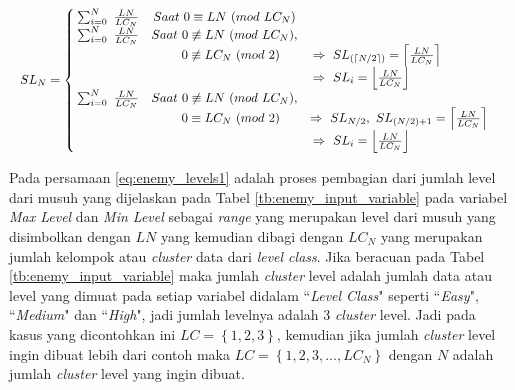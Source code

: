 \begin{equation}\label{eq:enemy_levels1}
	\resizebox{\columnwidth}{!}{%
		$SL_{N} = \left\{\begin{matrix}
		\hspace{0.2em} \sum_{i = 0}^{N}\ \frac{LN}{LC_{N}} & Saat\ 0 \equiv LN\ (mod\ LC_{N}) & \\
		
		\hspace{0.2em} \sum_{i = 0}^{N}\ \frac{LN}{LC_{N}} & Saat\ 0 \not\equiv LN\ (mod\ LC_{N}), & \\
		&\hspace{1.0em}  0 \not\equiv LC_{N}\ (mod\ 2) & \hspace{-3.5em} \Rightarrow\ SL_{(\left \lceil N/2 \right \rceil)}  = \left \lceil \frac{LN}{LC_{N}} \right \rceil &\\
		
		& & \hspace{-6.0em} \Rightarrow\ SL_{i}  = \left \lfloor \frac{LN}{LC_{N}} \right \rfloor &\\
		
		\hspace{0.2em} \sum_{i = 0}^{N}\ \frac{LN}{LC_{N}} & Saat\ 0 \not\equiv LN\ (mod\ LC_{N}), & \\
		&\hspace{1.0em}  0 \equiv LC_{N}\ (mod\ 2) & \Rightarrow\ SL_{N/2},\ SL_{(N/2) + 1}  = \left \lceil \frac{LN}{LC_{N}} \right \rceil &\\
		
		& & \hspace{-6.0em} \Rightarrow\ SL_{i}  = \left \lfloor \frac{LN}{LC_{N}} \right \rfloor &\\
		\end{matrix}\right.$%
	}
\end{equation}
\vspace{1ex}

Pada persamaan \ref{eq:enemy_levels1} adalah proses pembagian dari jumlah level dari musuh yang dijelaskan pada Tabel \ref{tb:enemy_input_variable} pada variabel \textit{Max Level} dan \textit{Min Level} sebagai \textit{range} yang merupakan level dari musuh yang disimbolkan dengan $LN$ yang kemudian dibagi dengan  $LC_{N}$ yang merupakan jumlah kelompok atau \textit{cluster} data dari \textit{level class}. Jika beracuan pada Tabel \ref{tb:enemy_input_variable} maka jumlah \textit{cluster} level adalah jumlah data atau level yang dimuat pada setiap variabel didalam ``\textit{Level Class}" seperti ``\textit{Easy}", ``\textit{Medium}" dan ``\textit{High}", jadi jumlah levelnya adalah 3 \textit{cluster} level. Jadi pada kasus yang dicontohkan ini $LC = \left \{1, 2, 3 \right \}$, kemudian jika jumlah \textit{cluster} level ingin dibuat lebih dari contoh maka $LC = \left \{1, 2, 3,..., LC_{N} \right \}$ dengan $N$ adalah jumlah \textit{cluster} level yang ingin dibuat.
\vspace{1ex}

